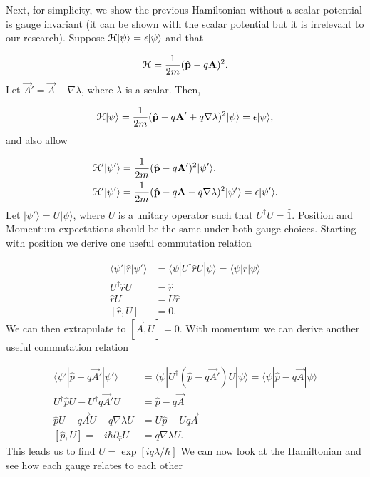 Next, for simplicity, we show the previous Hamiltonian without a scalar potential is gauge invariant (it can be shown with the scalar potential but it is irrelevant to our research).
Suppose $\mathcal{H}|\psi \rangle = \epsilon |\psi \rangle$ and that

\begin{equation}
  \ham = \dfrac{1}{2m} (\hat{p} - q \vec{A})^2.
\end{equation}
Let $\vec{A}' = \vec{A}+\nabla\lambda$, where $\lambda$ is a scalar.
Then,

\begin{equation}
  \ham |\psi\rangle = \dfrac{1}{2m} (\hat{p} - q \vec{A}' + q \nabla \lambda)^2 |\psi\rangle = \epsilon |\psi\rangle,
\end{equation}
and also allow

\begin{align}
  \ham' |\psi'\rangle &= \dfrac{1}{2m} (\hat{p} - q \vec{A}')^2 |\psi'\rangle, \nonumber \\
  \ham' |\psi'\rangle &= \dfrac{1}{2m} (\hat{p} - q \vec{A} - q \nabla \lambda)^2 |\psi'\rangle = \epsilon |\psi'\rangle.
\end{align}
Let $|\psi'\rangle = U |\psi\rangle$, where $U$ is a unitary operator such that $U^{\dagger} U = \hat{1}$.
Position and Momentum expectations should be the same under both gauge choices.
Starting with position we derive one useful commutation relation

\begin{align}
  \langle \psi' | \hat{r} | \psi'\rangle &= \langle \psi | U^{\dagger} \hat{r} U | \psi\rangle = \langle \psi | \hat{r} | \psi\rangle \nonumber \\
  U^{\dagger} \hat{r} U &= \hat{r} \nonumber \\
  \hat{r} U &= U \hat{r} \nonumber \\
  [\hat{r},U] &= 0.
\end{align}
We can then extrapulate to $[\vec{A},U] = 0$.
With momentum we can derive another useful commutation relation

\begin{align}
  \langle \psi' | \hat{p}-q \vec{A}' | \psi'\rangle &= \langle \psi | U^{\dagger} (\hat{p} - q \vec{A}') U | \psi\rangle = \langle \psi | \hat{p} - q \vec{A} | \psi\rangle \nonumber \\
  U^{\dagger} \hat{p} U - U^{\dagger} q\vec{A}'U &= \hat{p} - q \vec{A} \nonumber \\
  \hat{p} U - q\vec{A} U - q\nabla\lambda U &= U \hat{p} - U q \vec{A} \nonumber \\
  [\hat{p},U] = -i\hbar\partial_{\hat{r}} U &= q\nabla\lambda U.
\end{align}
This leads us to find $U = \exp[iq\lambda/\hbar]$
We can now look at the Hamiltonian and see how each gauge relates to each other

